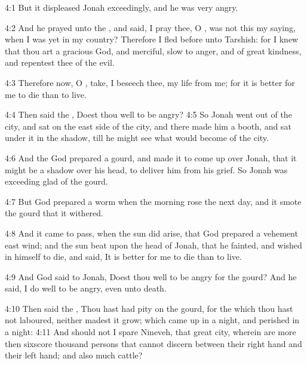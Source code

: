 4:1 But it displeased Jonah exceedingly, and he was very angry.

4:2 And he prayed unto the \LORD, and said, I pray thee, O \LORD, was not this my saying, when I was yet in my country? Therefore I fled before unto Tarshish: for I knew that thou art a gracious God, and merciful, slow to anger, and of great kindness, and repentest thee of the evil.

4:3 Therefore now, O \LORD, take, I beseech thee, my life from me; for it is better for me to die than to live.

4:4 Then said the \LORD, Doest thou well to be angry?  4:5 So Jonah went out of the city, and sat on the east side of the city, and there made him a booth, and sat under it in the shadow, till he might see what would become of the city.

4:6 And the \LORD God prepared a gourd, and made it to come up over Jonah, that it might be a shadow over his head, to deliver him from his grief. So Jonah was exceeding glad of the gourd.

4:7 But God prepared a worm when the morning rose the next day, and it smote the gourd that it withered.

4:8 And it came to pass, when the sun did arise, that God prepared a vehement east wind; and the sun beat upon the head of Jonah, that he fainted, and wished in himself to die, and said, It is better for me to die than to live.

4:9 And God said to Jonah, Doest thou well to be angry for the gourd?  And he said, I do well to be angry, even unto death.

4:10 Then said the \LORD, Thou hast had pity on the gourd, for the which thou hast not laboured, neither madest it grow; which came up in a night, and perished in a night: 4:11 And should not I spare Nineveh, that great city, wherein are more then sixscore thousand persons that cannot discern between their right hand and their left hand; and also much cattle?

